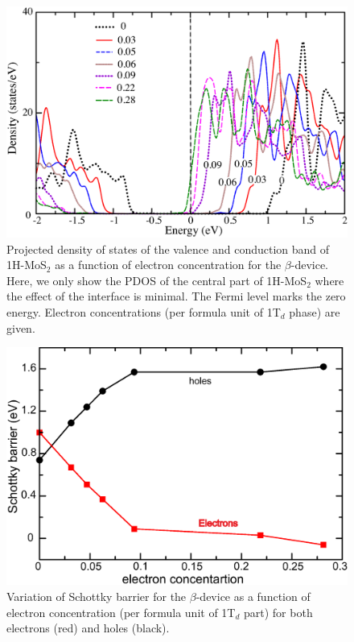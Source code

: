 \begin{figure}[htb]
\centering
\includegraphics[width=0.8\linewidth]{dos-charge.eps}
\caption{Projected density of states of the valence and conduction band of 1H-MoS$_2$ as a function of electron concentration for the $\beta$-device. Here, we only show the PDOS of the central part of 1H-MoS$_2$ where the effect of the interface is minimal.  The Fermi level marks the zero energy. Electron concentrations (per formula unit of 1T$_d$ phase) are given. }
\end{figure}

\begin{figure}[htb]
\centering
\includegraphics[width=0.8\linewidth]{Schottky-Charge.eps}
\caption{\label{sch-chg}Variation of Schottky barrier for the $\beta$-device as a function of electron concentration (per formula unit of 1T$_d$ part) for both electrons (red) and holes (black).}
\end{figure}

